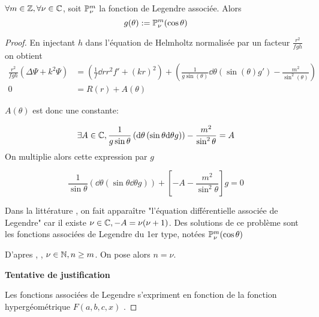 \begin{prop}$\forall m \in \Z, \forall \nu \in \C$, soit $\P^m_\nu$ la fonction de Legendre associée. Alors
  \begin{equation} 
    g(\theta) := \P^m_\nu(\cos \theta)
  \end{equation}
\end{prop}
\begin{proof}

En injectant $h$ dans l'équation de Helmholtz normalisée par un facteur $\frac{r^2}{fgh}$ on obtient
\begin{align*}
     \frac{r^2}{fgh} \left(\Delta \Psi + k^2 \Psi\right) &= 
     \left(\frac{1}{f}\dd{r}{r^2f'} + (kr)^2\right) + 
     \left(\frac{1}{g\sin(\theta)} \dd{\theta}(\sin(\theta)g') -  \frac{m^2}{\sin^2(\theta)}\right) \\
 0 &= R(r) + A(\theta)
\end{align*}

$A(\theta)$ est donc une constante:

\[
 \exists A \in \C, \frac{1}{g\sin\theta}\left(\dd{\theta}\left(\sin\theta\dd{\theta}g\right)\right)  -\frac{m^2}{\sin^2\theta} = A
\]
  On multiplie alors cette expression par $g$

  \begin{equation*}
    \label{eq_helm_legendre}\frac{1}{\sin\theta}\left(\dd{\theta}\left(\sin\theta\dd{\theta}g\right)\right) + \left[- A -\frac{m^2}{\sin^2\theta}\right]g = 0
  \end{equation*}

Dans la littérature \cite{abramowitz_handbook_1964}, on fait apparaître "l'équation différentielle associée de Legendre" car il existe $
\nu \in \C,-A = \nu(\nu + 1)$. Des solutions de ce problème sont les fonctions associées de Legendre du 1er type, notées $\P^m_\nu(\cos \theta)$ 

D'apres \cite[p.~1264]{abramowitz_handbook_1964}, \cite[p.~84]{bohren_absorption_2004}, $\nu \in \N, n\ge m $. On pose alors $n = \nu$.


{ \color{red}
\textbf{Tentative de justification}

Les fonctions associées de Legendre s'expriment en fonction de la fonction hypergéométrique $F(a,b,c,x)$ \cite[p.~332]{abramowitz_handbook_1964}.

}
\end{proof}
